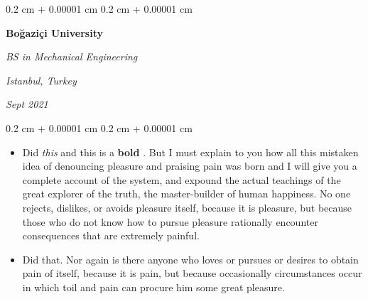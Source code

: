 \documentclass[10pt, letterpaper]{article}
\newenvironment{highlights}{
    \begin{itemize}[
        topsep=0.10 cm,
        parsep=0.10 cm,
        partopsep=0pt,
        itemsep=0pt,
        leftmargin=0.4 cm + 10pt
    ]
}{
    \end{itemize}
} %
\newenvironment{onecolentry}{
    \begin{adjustwidth}{
        0.2 cm + 0.00001 cm
    }{
        0.2 cm + 0.00001 cm
    }
}{
    \end{adjustwidth}
} %
\newenvironment{twocolentry}[2][]{
    \onecolentry
    \def\secondColumn{#2}
    \setcolumnwidth{\fill, 4.5 cm}
    \begin{paracol}{2}
}{
    \switchcolumn \raggedleft \secondColumn
    \end{paracol}
    \endonecolentry
} %
\let\hrefWithoutArrow\href
\renewcommand{\href}[2]{\hrefWithoutArrow{#1}{\ifthenelse{\equal{#2}{}}{ }{#2 }\raisebox{.15ex}{\footnotesize \faExternalLink*}}}
\begin{document}
        \begin{twocolentry}{
        \textit{Istanbul, Turkey}    
            
        \textit{Sept 2021}}
            \textbf{Boğaziçi University}

            \textit{BS in Mechanical Engineering}
        \end{twocolentry}
        \vspace{0.10 cm}
        \begin{onecolentry}
            \begin{highlights}
                \item Did \textit{this} and this is a \textbf{bold} \href{https://example.com}{link}. But I must explain to you how all this mistaken idea of denouncing pleasure and praising pain was born and I will give you a complete account of the system, and expound the actual teachings of the great explorer of the truth, the master-builder of human happiness. No one rejects, dislikes, or avoids pleasure itself, because it is pleasure, but because those who do not know how to pursue pleasure rationally encounter consequences that are extremely painful.
                \item Did that. Nor again is there anyone who loves or pursues or desires to obtain pain of itself, because it is pain, but because occasionally circumstances occur in which toil and pain can procure him some great pleasure.
            \end{highlights}
        \end{onecolentry}


        \vspace{0.2 cm}
\end{document}

